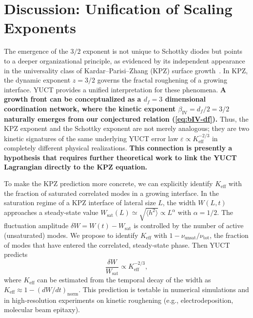 \documentclass[12pt,a4paper]{article}
\newcommand{\Keff}{K_{\mathrm{eff}}}
\begin{document}
	\section{Discussion: Unification of Scaling Exponents}
	
	The emergence of the $3/2$ exponent is not unique to Schottky diodes
	but points to a deeper organizational principle, as evidenced by its
	independent appearance in the universality class of
	Kardar–Parisi–Zhang (KPZ) surface growth~\cite{KPZ}. In KPZ, the
	dynamic exponent $z = 3/2$ governs the fractal roughening of a
	growing interface. YUCT provides a unified interpretation for these
	phenomena. \textbf{A growth front can be conceptualized as a
		$d_f = 3$ dimensional coordination network, where the kinetic
		exponent $\beta_{\mathrm{IV}} = d_f/2 = 3/2$ naturally emerges
		from our conjectured relation (\ref{eq:bIV-df}).}
	Thus, the KPZ exponent and the Schottky exponent are not
	merely analogous; they are two kinetic signatures of the same
	underlying YUCT error law $\varepsilon \propto \Keff^{-2/3}$ in
	completely different physical realizations. \textbf{This
		connection is presently a hypothesis that requires further
		theoretical work to link the YUCT Lagrangian directly to the KPZ
		equation.}
	
	To make the KPZ prediction more concrete, we can explicitly
	identify $\Keff$ with the fraction of saturated correlated modes in
	a growing interface. In the saturation regime of a KPZ interface of
	lateral size $L$, the width $W(L,t)$ approaches a steady‑state value
	$W_{\text{sat}}(L) \simeq \sqrt{\langle h^2 \rangle} \propto L^{\alpha}$
	with $\alpha = 1/2$. The fluctuation amplitude
	$\delta W = W(t) - W_{\text{sat}}$ is controlled by the number of
	active (unsaturated) modes. We propose to identify $\Keff$ with
	$1 - \nu_{\text{unsat}}/\nu_{\text{tot}}$, the fraction of modes
	that have entered the correlated, steady‑state phase. Then YUCT
	predicts
	\begin{equation}
		\frac{\delta W}{W_{\text{sat}}} \propto \Keff^{-2/3},
		\label{eq:kpz-prediction}
	\end{equation}
	where $\Keff$ can be estimated from the temporal decay of the width
	as $\Keff \approx 1 - (dW/dt)_{\text{norm}}$. This prediction is
	testable in numerical simulations and in high‑resolution experiments
	on kinetic roughening (e.g., electrodeposition, molecular beam
	epitaxy).
	
\end{document}
